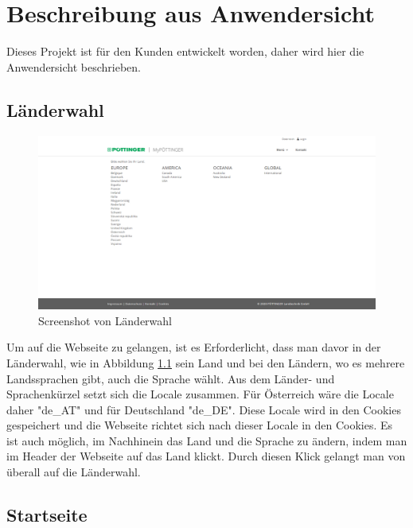 \chapter{Beschreibung aus Anwendersicht} \label{anwendersicht}

Dieses Projekt ist für den Kunden entwickelt worden, daher wird hier die Anwendersicht beschrieben.

\section{Länderwahl}
\begin{figure}[h]
	\centerline{
		\includegraphics[width=1\textwidth, frame]{./grafiken/erm_country_selection.png}
	}
	\vskip0pt
	\caption{Screenshot von Länderwahl} \label{fig:countrySelection}
\end{figure}
Um auf die Webseite zu gelangen, ist es Erforderlicht, dass man davor in der Länderwahl, wie in Abbildung \ref{fig:countrySelection} sein Land und bei den Ländern, wo es mehrere Landssprachen gibt, auch die Sprache wählt. Aus dem Länder- und Sprachenkürzel setzt sich die Locale zusammen. Für Österreich wäre die Locale daher "de\_AT" und für Deutschland "de\_DE". Diese Locale wird in den Cookies gespeichert und die Webseite richtet sich nach dieser Locale in den Cookies. Es ist auch möglich, im Nachhinein das Land und die Sprache zu ändern, indem man im Header der Webseite auf das Land klickt. Durch diesen Klick gelangt man von überall auf die Länderwahl.

\section{Startseite}

